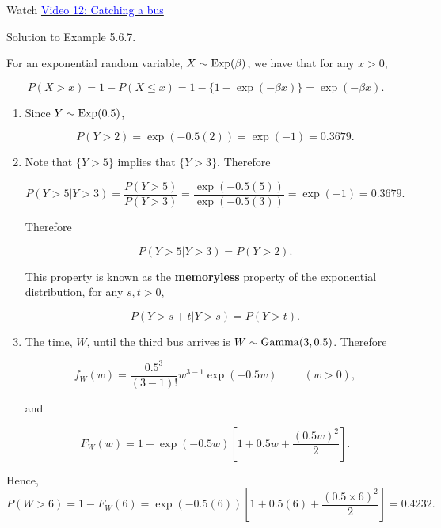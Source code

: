 \documentclass[
]{book}
\providecommand{\tightlist}{%
  \setlength{\itemsep}{0pt}\setlength{\parskip}{0pt}}
\begin{document}
Watch \href{https://mediaspace.nottingham.ac.uk/media/Catch+The+Bus+FINAL+VERSION/1_vtwjyiai}{\textcolor{blue}{Video 12: Catching a bus}}

Solution to Example 5.6.7.

For an exponential random variable, \(X \sim {\rm Exp} (\beta)\), we have that for any \(x>0\),

\[ P(X >x) = 1 - P(X \leq x) = 1- \{ 1 -\exp(-\beta x) \} = \exp(-\beta x).\]

\begin{enumerate}
\def\labelenumi{(\alph{enumi})}
\tightlist
\item
  Since \(Y \sim {\rm Exp} (0.5)\),

  \[ P(Y >2) = \exp (-0.5(2)) = \exp(-1) =0.3679.\]
\item
  Note that \(\{Y>5\}\) implies that \(\{Y > 3\}\). Therefore

  \[ P(Y>5|Y>3) = \frac{P(Y >5)}{P(Y>3)} = \frac{\exp(-0.5(5))}{\exp(-0.5(3))} = \exp(-1) =0.3679.\]

  Therefore

  \[ P(Y > 5 |Y >3) = P(Y>2). \]

  This property is known as the \textbf{memoryless} property of the exponential distribution, for any \(s,t>0\),

  \[ P(Y > s+t| Y>s) = P(Y >t).\]
\item
  The time, \(W\), until the third bus arrives is \(W \sim {\rm Gamma} (3,0.5)\). Therefore

  \[ f_W (w) = \frac{0.5^3}{(3-1)!} w^{3-1} \exp(-0.5 w)  \hspace{1cm} (w>0), \]

  and

  \[ F_W (w) = 1- \exp (-0.5 w) \left[ 1 + 0.5 w + \frac{(0.5w)^2}{2} \right]. \]
\end{enumerate}

Hence,\\

\[P(W>6) = 1 -F_W(6) = \exp(-0.5(6)) \left[ 1 +0.5(6) + \frac{(0.5\times 6)^2}{2} \right] = 0.4232.\]
\end{document}
